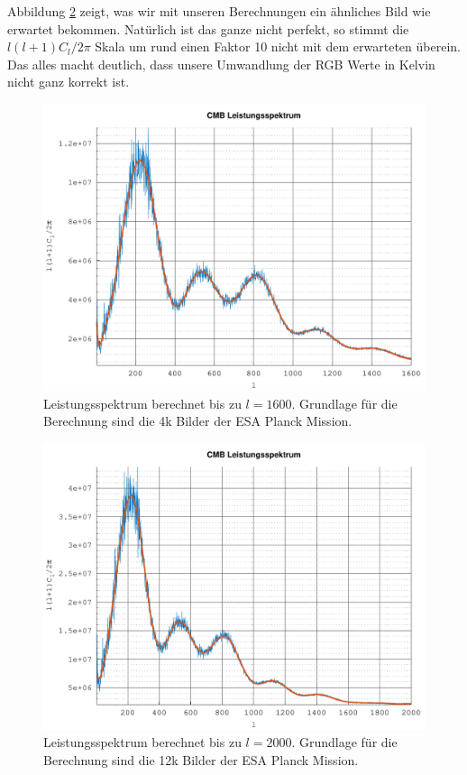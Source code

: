 Abbildung \ref{fig:cmb-power-spec-2000} zeigt, was wir mit unseren Berechnungen 
ein ähnliches Bild wie erwartet bekommen. Natürlich ist das ganze nicht 
perfekt, so stimmt die $l(l+1)C_l/2\pi$ Skala um rund einen Faktor 10 nicht mit 
dem erwarteten überein. Das alles macht deutlich, dass unsere Umwandlung der 
RGB Werte in Kelvin nicht ganz korrekt ist.

\begin{figure}
	\centering
	\includegraphics[width=\linewidth]{cmb/data/4k1800-500.pdf}
	\caption{Leistungsspektrum berechnet bis zu $l = 1600$. Grundlage für die 
		Berechnung sind die 4k Bilder der ESA Planck Mission.}
	\label{fig:cmb-power-spec-1600}
\end{figure}

\begin{figure}
	\centering
	\includegraphics[width=\linewidth]{cmb/data/12k2500-500.pdf}
	\caption{Leistungsspektrum berechnet bis zu $l = 2000$. Grundlage für die 
	Berechnung sind die 12k Bilder der ESA Planck Mission.}
	\label{fig:cmb-power-spec-2000}
\end{figure}

